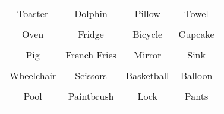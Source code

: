 \documentclass[12pt,a4paper]{article}
\begin{document}
\thispagestyle{empty}
\begin{table}[]
\centering
\Huge
\begin{tabular}{cccc}
 Toaster& Dolphin& Pillow& Towel\\  & & & \\
 Oven& Fridge& Bicycle& Cupcake\\  & & & \\
 Pig& French Fries& Mirror& Sink\\  & & & \\
 Wheelchair& Scissors& Basketball& Balloon\\  & & & \\
 Pool& Paintbrush& Lock& Pants\\  & & & \\
\end{tabular}
\end{table}
\end{document}
